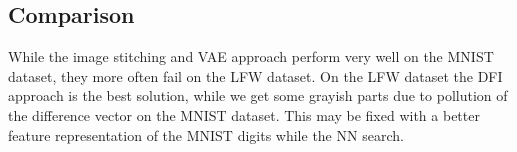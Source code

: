\documentclass[
     11pt,         %
     a4paper,      %
     oneside,
     ]{article}
\begin{document}
\subsection{Comparison}
While the image stitching and VAE approach perform very well on the MNIST dataset, they more often fail on the LFW dataset. On the LFW dataset the DFI approach is the best solution, while we get some grayish parts due to pollution of the difference vector on the MNIST dataset. This may be fixed with a better feature representation of the MNIST digits while the NN search.


\newpage
{}
%

\printbibheading
\printbibliography[keyword=image, title={Image Resources}]
\newpage
\printbibliography[keyword=text, title={Text Resources}]
\end{document}
